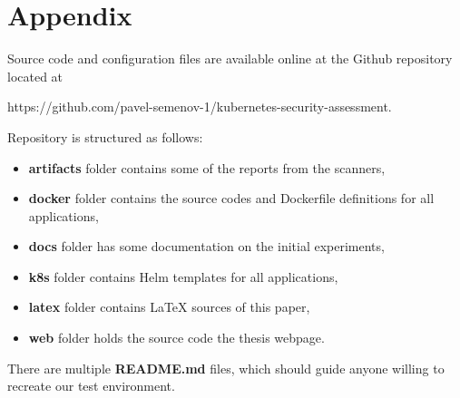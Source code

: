 \chapter*{Appendix}
\label{chap:appendix}

Source code and configuration files are available online at the Github repository located at 
\begin{center}
    https://github.com/pavel-semenov-1/kubernetes-security-assessment. 
\end{center}

Repository is structured as follows:
\begin{itemize}[noitemsep,nosep]
    \item \textbf{artifacts} folder contains some of the reports from the scanners,
    \item \textbf{docker} folder contains the source codes and Dockerfile definitions for all applications,
    \item \textbf{docs} folder has some documentation on the initial experiments,
    \item \textbf{k8s} folder contains Helm templates for all applications,
    \item \textbf{latex} folder contains \LaTeX{} sources of this paper,
    \item \textbf{web} folder holds the source code the thesis webpage.
\end{itemize}

There are multiple \textbf{README.md} files, which should guide anyone willing to recreate our test environment.